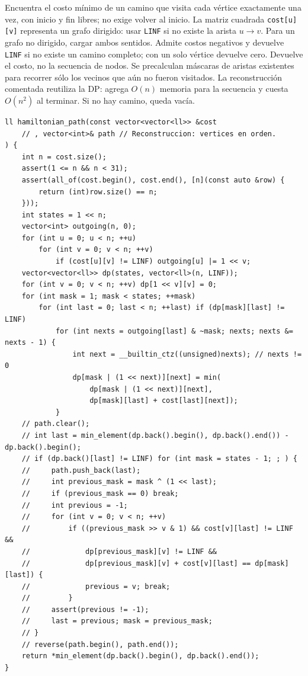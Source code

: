 Encuentra el costo m\'inimo de un camino que visita cada v\'ertice exactamente
una vez, con inicio y fin libres; no exige volver al inicio. La matriz cuadrada
\texttt{cost[u][v]} representa un grafo dirigido: usar \texttt{LINF} si no existe
la arista $u\to v$. Para un grafo no dirigido, cargar ambos sentidos.
Admite costos negativos y devuelve \texttt{LINF} si no existe un camino completo;
con un solo v\'ertice devuelve cero. Devuelve el costo, no la secuencia de nodos.
Se precalculan m\'ascaras de aristas existentes para recorrer s\'olo los vecinos
que a\'un no fueron visitados.
La reconstrucci\'on comentada reutiliza la DP: agrega $O(n)$ memoria para la
secuencia y cuesta $O(n^2)$ al terminar. Si no hay camino, queda vac\'ia.

\begin{lstlisting}[style=cpp]
ll hamiltonian_path(const vector<vector<ll>> &cost
    // , vector<int>& path // Reconstruccion: vertices en orden.
) {
    int n = cost.size();
    assert(1 <= n && n < 31);
    assert(all_of(cost.begin(), cost.end(), [n](const auto &row) {
        return (int)row.size() == n;
    }));
    int states = 1 << n;
    vector<int> outgoing(n, 0);
    for (int u = 0; u < n; ++u)
        for (int v = 0; v < n; ++v)
            if (cost[u][v] != LINF) outgoing[u] |= 1 << v;
    vector<vector<ll>> dp(states, vector<ll>(n, LINF));
    for (int v = 0; v < n; ++v) dp[1 << v][v] = 0;
    for (int mask = 1; mask < states; ++mask)
        for (int last = 0; last < n; ++last) if (dp[mask][last] != LINF)
            for (int nexts = outgoing[last] & ~mask; nexts; nexts &= nexts - 1) {
                int next = __builtin_ctz((unsigned)nexts); // nexts != 0
                dp[mask | (1 << next)][next] = min(
                    dp[mask | (1 << next)][next],
                    dp[mask][last] + cost[last][next]);
            }
    // path.clear();
    // int last = min_element(dp.back().begin(), dp.back().end()) - dp.back().begin();
    // if (dp.back()[last] != LINF) for (int mask = states - 1; ; ) {
    //     path.push_back(last);
    //     int previous_mask = mask ^ (1 << last);
    //     if (previous_mask == 0) break;
    //     int previous = -1;
    //     for (int v = 0; v < n; ++v)
    //         if ((previous_mask >> v & 1) && cost[v][last] != LINF &&
    //             dp[previous_mask][v] != LINF &&
    //             dp[previous_mask][v] + cost[v][last] == dp[mask][last]) {
    //             previous = v; break;
    //         }
    //     assert(previous != -1);
    //     last = previous; mask = previous_mask;
    // }
    // reverse(path.begin(), path.end());
    return *min_element(dp.back().begin(), dp.back().end());
}
\end{lstlisting}


